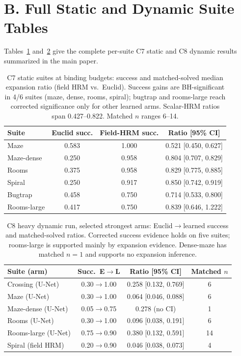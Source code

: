 \documentclass[letterpaper]{article} %
\newcommand{\stage}[1]{\textsc{#1}}
\begin{document}
\section{B. Full Static and Dynamic Suite Tables}

Tables~\ref{tab:c7} and~\ref{tab:c8} give the complete per-suite \stage{C7} static and \stage{C8} dynamic results summarized in the main paper.

\begin{table}[h]
\centering
\footnotesize
\setlength{\tabcolsep}{3pt}
\begin{tabular}{@{}lccc@{}}
\toprule
Suite & Euclid succ. & Field-HRM succ. & Ratio [95\% CI] \\
\midrule
Maze & 0.583 & 1.000 & 0.521 [0.450, 0.627] \\
Maze-dense & 0.250 & 0.958 & 0.804 [0.707, 0.829] \\
Rooms & 0.375 & 0.958 & 0.829 [0.775, 0.885] \\
Spiral & 0.250 & 0.917 & 0.850 [0.742, 0.919] \\
Bugtrap & 0.458 & 0.750 & 0.714 [0.533, 0.800] \\
Rooms-large & 0.417 & 0.750 & 0.839 [0.646, 1.222] \\
\bottomrule
\end{tabular}
\caption{\stage{C7} static suites at binding budgets: success and matched-solved median expansion ratio (field HRM vs.\ Euclid). Success gains are BH-significant in 4/6 suites (maze, dense, rooms, spiral); bugtrap and rooms-large reach corrected significance only for other learned arms. Scalar-HRM ratios span 0.427--0.822. Matched $n$ ranges 6--14.}
\label{tab:c7}
\end{table}

\begin{table}[h]
\centering
\scriptsize
\setlength{\tabcolsep}{3pt}
\begin{tabular}{@{}lccc@{}}
\toprule
Suite (arm) & Succ.\ E$\to$L & Ratio [95\% CI] & Matched $n$ \\
\midrule
Crossing (U-Net) & 0.30$\to$1.00 & 0.258 [0.132, 0.769] & 6 \\
Maze (U-Net) & 0.30$\to$1.00 & 0.064 [0.046, 0.088] & 6 \\
Maze-dense (U-Net) & 0.05$\to$0.75 & 0.278 (no CI) & 1 \\
Rooms (U-Net) & 0.30$\to$1.00 & 0.096 [0.038, 0.191] & 6 \\
Rooms-large (U-Net) & 0.75$\to$0.90 & 0.380 [0.132, 0.591] & 14 \\
Spiral (field HRM) & 0.20$\to$0.90 & 0.046 [0.038, 0.073] & 4 \\
\bottomrule
\end{tabular}
\caption{\stage{C8} heavy dynamic run, selected strongest arms: Euclid$\to$learned success and matched-solved ratios. Corrected success evidence holds on five suites; rooms-large is supported mainly by expansion evidence. Dense-maze has matched $n{=}1$ and supports no expansion inference.}
\label{tab:c8}
\end{table}
\end{document}
